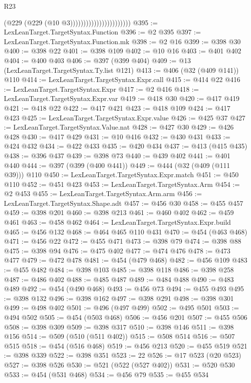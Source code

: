 \begin{lexlean}{R23}
\begin{coremodule}
                                            (@229 (@229 (@10 @3)))))))))))))))))))))))
@395 := LexLeanTarget.TargetSyntax.Function
@396 := @2 @395
@397 := LexLeanTarget.TargetSyntax.Function.mk
@398 := @2 @16
@399 := @398 @30
@400 := @398 @22
@401 := @398 @109
@402 := @10 @16
@403 := @401 @402
@404 := @400 @403
@406 := @397 (@399 @404)
@409 := @13 (LexLeanTarget.TargetSyntax.Ty.list @121)
@413 := @406 (@32 (@409 @141)) @110
@414 := LexLeanTarget.TargetSyntax.Expr.call
@415 := @414 @22
@416 := LexLeanTarget.TargetSyntax.Expr
@417 := @2 @416
@418 := LexLeanTarget.TargetSyntax.Expr.var
@419 := @418 @30
@420 := @417 @419
@421 := @418 @22
@422 := @417 @421
@423 := @418 @109
@424 := @417 @423
@425 := LexLeanTarget.TargetSyntax.Expr.value
@426 := @425 @37
@427 := LexLeanTarget.TargetSyntax.Value.nat
@428 := @427 @30
@429 := @426 @428
@430 := @417 @429
@431 := @10 @416
@432 := @430 @431
@433 := @424 @432
@434 := @422 @433
@435 := @420 @434
@437 := @413 (@415 @435)
@438 := @396 @437
@439 := @398 @73
@440 := @439 @402
@441 := @401 @440
@444 := @397 (@399 (@400 @441))
@449 := @444 (@32 (@409 (@111 @39))) @110
@450 := LexLeanTarget.TargetSyntax.Expr.match
@451 := @450 @110
@452 := @451 @423
@453 := LexLeanTarget.TargetSyntax.Arm
@454 := @2 @453
@455 := LexLeanTarget.TargetSyntax.Arm.arm
@456 := LexLeanTarget.TargetSyntax.Shape.adt
@457 := @456 @30
@458 := @455 @457
@459 := @398 @201
@460 := @398 @213
@461 := @460 @402
@462 := @459 @461
@463 := @458 @462
@464 := LexLeanTarget.TargetSyntax.Expr.build
@465 := @456 @132
@468 := @464 @465 @110 @431
@470 := @454 (@463 @468)
@471 := @456 @22
@472 := @455 @471
@473 := @398 @79
@474 := @398 @88
@475 := @398 @94
@476 := @475 @402
@477 := @474 @476
@478 := @473 @477
@479 := @472 @478
@481 := @454 (@479 @468)
@482 := @456 @109
@483 := @455 @482
@484 := @398 @103
@485 := @398 @118
@486 := @398 @258
@487 := @486 @402
@488 := @485 @487
@489 := @484 @488
@490 := @483 @489
@492 := @454 (@490 @468)
@493 := @456 @73
@494 := @455 @493
@495 := @398 @132
@496 := @398 @162
@497 := @398 @291
@498 := @398 @301
@499 := @498 @402
@501 := @496 (@497 @499)
@502 := @495 @501
@503 := @494 @502
@505 := @454 (@503 @468)
@506 := @456 @201
@507 := @455 @506
@508 := @398 @309
@509 := @398 @317
@510 := @398 @146
@511 := @398 @156
@514 := @509 (@510 (@511 @402))
@515 := @508 @514
@516 := @507 @515
@518 := @454 (@516 @468)
@519 := @456 @213
@520 := @455 @519
@521 := @398 @339
@522 := @398 @351
@523 := 22
@526 := @17 @523 (@20 @523)
@527 := @398 @526
@530 := @521 (@522 (@527 @402))
@531 := @520 @530
@533 := @454 (@531 @468)
@534 := @456 @79
@535 := @455 @534

\end{coremodule}
\end{lexlean}
